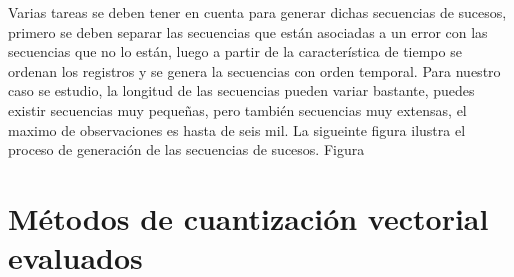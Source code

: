 Varias tareas se deben tener en cuenta para generar dichas secuencias de sucesos, primero se deben separar las secuencias que están asociadas a un error con las secuencias que no lo están, luego a partir de la característica de tiempo se ordenan los registros y se genera la secuencias con orden temporal. Para nuestro caso se estudio, la longitud de las secuencias pueden variar bastante, puedes existir secuencias muy pequeñas, pero también secuencias muy extensas, el maximo de observaciones es hasta de seis mil.
La sigueinte figura ilustra el proceso de generación de las secuencias de sucesos. Figura



\section{Métodos de cuantización vectorial evaluados} %
\label{section2.4}


